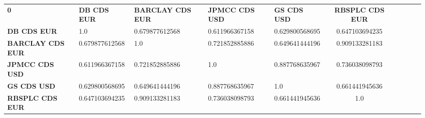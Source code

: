 \begin{center}
 \begin{tabular}{|l|l|l|l|l|c|c|c|c|c|}
\hline
\textbf{0} & \textbf{DB CDS EUR} & \textbf{BARCLAY CDS EUR} & \textbf{JPMCC CDS USD} & \textbf{GS CDS USD} & \textbf{RBSPLC CDS EUR}\\\hhline{|=|=|=|=|=|=|}
\textbf{DB CDS EUR} & 1.0 & 0.679877612568 & 0.611966367158 & 0.629800568695 & 0.647103694235\\
\textbf{BARCLAY CDS EUR} & 0.679877612568 & 1.0 & 0.721852885886 & 0.649641444196 & 0.909133281183\\
\textbf{JPMCC CDS USD} & 0.611966367158 & 0.721852885886 & 1.0 & 0.887768635967 & 0.736038098793\\
\textbf{GS CDS USD} & 0.629800568695 & 0.649641444196 & 0.887768635967 & 1.0 & 0.661441945636\\
\textbf{RBSPLC CDS EUR} & 0.647103694235 & 0.909133281183 & 0.736038098793 & 0.661441945636 & 1.0\\
\hline
\end{tabular}
\end{center}